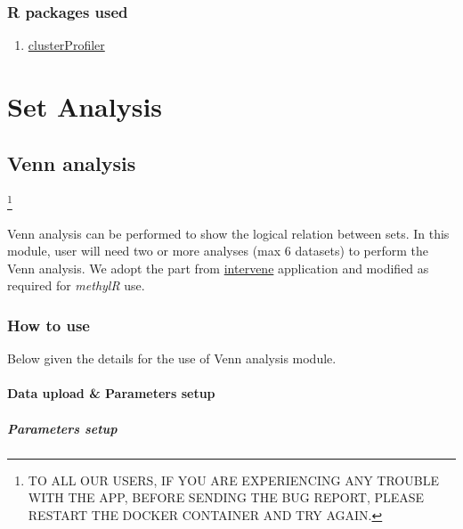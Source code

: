 \documentclass[
  a4paper,
  oneside,
  open=any]{scrreport}
\providecommand{\tightlist}{%
  \setlength{\itemsep}{0pt}\setlength{\parskip}{0pt}}\usepackage{longtable,booktabs,array}
\begin{document}
\hypertarget{r-packages-used-3}{%
\section{R packages used}\label{r-packages-used-3}}

\begin{enumerate}
\def\labelenumi{\arabic{enumi}.}
\tightlist
\item
  \href{https://bioconductor.org/packages/release/bioc/vignettes/clusterProfiler/inst/doc/clusterProfiler.html}{clusterProfiler}
\end{enumerate}

\part{Set Analysis}

\hypertarget{sec-venn}{%
\chapter{Venn analysis}\label{sec-venn}}

\footnote{TO ALL OUR USERS, IF YOU ARE EXPERIENCING ANY TROUBLE WITH THE
  APP, BEFORE SENDING THE BUG REPORT, PLEASE RESTART THE DOCKER
  CONTAINER AND TRY AGAIN.}

Venn analysis can be performed to show the logical relation between
sets. In this module, user will need two or more analyses (max 6
datasets) to perform the Venn analysis. We adopt the part from
\href{https://github.com/asntech/intervene}{intervene}
\autocite{khan2017intervene} application and modified as required for
\emph{methylR} use.

\hypertarget{how-to-use-6}{%
\section{How to use}\label{how-to-use-6}}

Below given the details for the use of Venn analysis module.

\hypertarget{data-upload-parameters-setup-2}{%
\subsection{Data upload \& Parameters
setup}\label{data-upload-parameters-setup-2}}

\hypertarget{parameters-setup-1}{%
\subsubsection{Parameters setup}\label{parameters-setup-1}}
\end{document}
